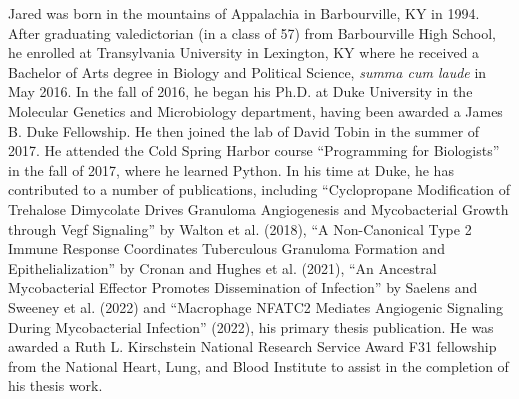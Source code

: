 \documentclass[PhD]{dukethesis2006}
\begin{document}
	
\biography

\begin{doublespace}

Jared was born in the mountains of Appalachia in Barbourville, KY in 1994. After graduating valedictorian (in a class of 57) from Barbourville High School, he enrolled at Transylvania University in Lexington, KY where he received a Bachelor of Arts degree in Biology and Political Science, \textit{summa cum laude} in May 2016. In the fall of 2016, he began his Ph.D. at Duke University in the Molecular Genetics and Microbiology department, having been awarded a James B. Duke Fellowship. He then joined the lab of David Tobin in the summer of 2017. He attended the Cold Spring Harbor course ``Programming for Biologists'' in the fall of 2017, where he learned Python. In his time at Duke, he has contributed to a number of publications, including ``Cyclopropane Modification of Trehalose Dimycolate Drives Granuloma Angiogenesis and Mycobacterial Growth through Vegf Signaling'' by Walton et al. (2018), ``A Non-Canonical Type 2 Immune Response Coordinates Tuberculous Granuloma Formation and Epithelialization'' by Cronan and Hughes et al. (2021), ``An Ancestral Mycobacterial Effector Promotes Dissemination of Infection'' by Saelens and Sweeney et al. (2022) and ``Macrophage NFATC2 Mediates Angiogenic Signaling During Mycobacterial Infection'' (2022), his primary thesis publication. He was awarded a Ruth L. Kirschstein National Research Service Award F31 fellowship from the National Heart, Lung, and Blood Institute to assist in the completion of his thesis work.

\end{doublespace}
\end{document}

